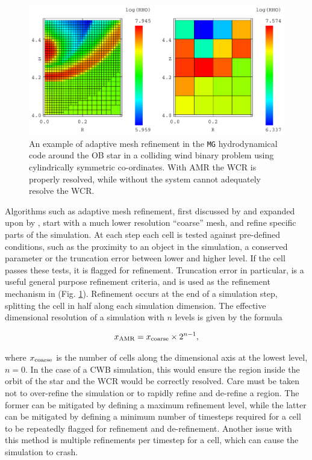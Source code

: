\begin{figure}[h]
  \centering
  \includegraphics[width=5in]{assets/mergecellc.pdf}
  \caption[Adaptive mesh refinement comparison]{An example of adaptive mesh refinement in the \texttt{MG} hydrodynamical code around the OB star in a colliding wind binary problem using cylindrically symmetric co-ordinates. With AMR the WCR is properly resolved, while without the system cannot adequately resolve the WCR.}
  \label{fig:mgrefine}
\end{figure}

Algorithms such as adaptive mesh refinement, first discussed by \textcite{bergerAdaptiveMeshRefinement1984} and expanded upon by \textcite{bergerLocalAdaptiveMesh1989}, start with a much lower resolution ``coarse'' mesh, and refine specific parts of the simulation.
At each step each cell is tested against pre-defined conditions, such as the proximity to an object in the simulation, a conserved parameter or the truncation error between lower and higher level.
If the cell passes these tests, it is flagged for refinement.
Truncation error in particular, is a useful general purpose refinement criteria, and is used as the refinement mechanism in \mg{} (Fig. \ref{fig:mgrefine}).
Refinement occurs at the end of a simulation step, splitting the cell in half along each simulation dimension.
The effective dimensional resolution of a simulation with $n$ levels is given by the formula

\begin{equation}
  x_\text{AMR} = x_\text{coarse} \times 2^{n-1},
\end{equation}

\noindent
where $x_\text{coarse}$ is the number of cells along the dimensional axis at the lowest level, $n=0$.
In the case of a CWB simulation, this would ensure the region inside the orbit of the star and the WCR would be correctly resolved.
Care must be taken not to over-refine the simulation or to rapidly refine and de-refine a region.
The former can be mitigated by defining a maximum refinement level, while the latter can be mitigated by defining a minimum number of timesteps required for a cell to be repeatedly flagged for refinement and de-refinement.
Another issue with this method is multiple refinements per timestep for a cell, which can cause the simulation to crash.

